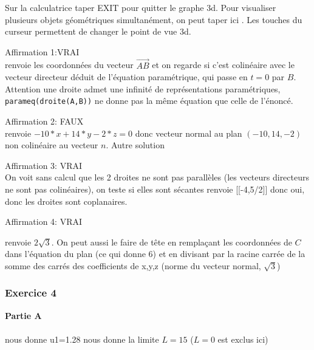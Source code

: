 \documentclass{article}
\begin{document}
\begin{giacjshere}


Sur la calculatrice taper EXIT pour quitter le graphe 3d.
Pour visualiser plusieurs objets géométriques simultanément, on peut taper ici
. Les touches du curseur permettent de changer le point de vue
3d.

Affirmation 1:VRAI \\
 renvoie les coordonnées du vecteur 
$\overrightarrow{AB}$ et on regarde si c'est colinéaire avec 
le vecteur directeur déduit de l'équation paramétrique, 
qui passe en $t=0$ par $B$. 
Attention une droite admet une infinité de représentations paramétriques, 
{\tt parameq(droite(A,B))} 
ne donne pas la même équation que celle de l'énoncé.

Affirmation 2: FAUX\\
renvoie $-10*x+14*y-2*z=0$ donc vecteur normal au plan $(-10,14,-2)$ 
non colinéaire au vecteur $n$. 
Autre solution 

Affirmation 3: VRAI\\
On voit sans calcul que les 2 droites ne sont pas parallèles 
(les vecteurs directeurs ne sont pas colinéaires),
on teste si elles sont sécantes
renvoie [[-4,5/2]] donc oui, donc les droites sont coplanaires.

Affirmation 4: VRAI\\

 renvoie $2\sqrt{3}$.
On peut aussi le faire de tête en remplaçant les coordonnées de $C$ 
dans l'équation du plan (ce qui donne 6) et en divisant par la racine 
carrée de la somme des carrés des coefficients de x,y,z 
(norme du vecteur normal, $\sqrt{3}$)

\subsubsection{Exercice 4}
{\bf Partie A}\\
\\
 nous donne u1=1.28
 nous donne la limite $L=15$ ($L=0$ est exclus ici)


\end{giacjshere}
\end{document}
